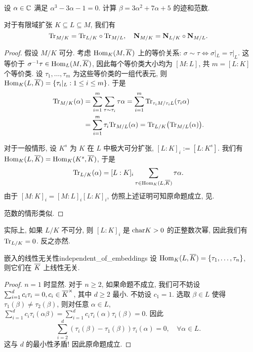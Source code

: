 \begin{exercise}
设 $\alpha\in{\mathbb{C}}$ 满足 $\alpha^3-3\alpha-1=0$. 计算 $\beta=3\alpha^2+7\alpha+5$ 的迹和范数.
\end{exercise}

\begin{corollary}{}{}
对于有限域扩张 $K\subseteq L\subseteq M$, 我们有
  \[{\mathrm{Tr}}_{M/K}={\mathrm{Tr}}_{L/K}\circ {\mathrm{Tr}}_{M/L},\quad {\mathbf{N}}_{M/K}={\mathbf{N}}_{L/K}\circ {\mathbf{N}}_{M/L}.\]
\end{corollary}
\begin{proof}
假设 $M/K$ 可分. 考虑 ${\mathrm{Hom}}_K(M,\overline K)$ 上的等价关系: $\sigma\sim\tau\iff \sigma|_L=\tau|_L$. 这等价于 $\sigma^{-1}\tau\in{\mathrm{Hom}}_L(M,\overline K)$, 因此每个等价类大小均为 $[M:L]$, 共 $m=[L:K]$ 个等价类. 设 $\tau_1,\dots,\tau_m$ 为这些等价类的一组代表元, 则 ${\mathrm{Hom}}_K(L,\overline K)=\left\{\tau_i|_L:1\le i\le m\right\}$. 于是
  \[\begin{split}
    {\mathrm{Tr}}_{M/K}(\alpha)&=\sum_{i=1}^m\sum_{\tau\sim\tau_i} \tau\alpha
      =\sum_{i=1}^m{\mathrm{Tr}}_{\tau_i M/\tau_i L}(\tau_i \alpha)\\
    &=\sum_{i=1}^m\tau_i{\mathrm{Tr}}_{M/L}(\alpha)
      ={\mathrm{Tr}}_{L/K}\bigl({\mathrm{Tr}}_{M/L}(\alpha)\bigr).
  \end{split}\]

对于一般情形, 设 $K^s$ 为 $K$ 在 $L$ 中极大可分扩张, $[L:K]_i:=[L:K^s]$. 我们有 ${\mathrm{Hom}}_{K}(L,\overline K)={\mathrm{Hom}}_K(K^s,\overline K)$, 于是
	\[{\mathrm{Tr}}_{L/K}(\alpha)=[L:K]_i\sum_{\tau\in{\mathrm{Hom}}_K(L,\overline K)}\tau\alpha.\]
由于 $[M:K]_i=[M:L]_i[L:K]_i$, 仿照上述证明可知原命题成立, 见\cite[Chapter II, \S 10]{ZariskiSamuel1958}.

范数的情形类似.
\end{proof}
\begin{remark}
实际上, 如果 $L/K$ 不可分, 则 $[L:K]_i$ 是 ${\mathrm{char}} K>0$ 的正整数次幂, 因此我们有 ${\mathrm{Tr}}_{L/K}=0$.
反之亦然.
\end{remark}

\begin{proposition}{嵌入的线性无关性}{independent_of_embeddings}
设 ${\mathrm{Hom}}_K(L,\overline K)=\left\{\tau_1,\dots,\tau_n\right\}$, 则它们在 $\overline K$ 上线性无关.
\end{proposition}
\begin{proof}
$n=1$ 时显然. 对于 $n\ge2$, 如果命题不成立, 我们可不妨设 $\sum_{i=1}^d c_i\tau_i=0,c_i\in\overline K^\times$, 其中 $d\ge 2$ 最小. 不妨设 $c_1=1$. 选取 $\beta\in L$ 使得 $\tau_1(\beta)\neq\tau_2(\beta)$, 则对任意 $\alpha\in L$, $\sum_{i=1}^d c_i\tau_i(\alpha\beta)=\sum_{i=1}^d c_i\tau_i(\alpha)\tau_i(\beta)=0$. 因此
	\[\sum_{i=2}^d(\tau_i(\beta)-\tau_1(\beta))\tau_i(\alpha)=0,\quad\forall \alpha\in L.\]
这与 $d$ 的最小性矛盾! 因此原命题成立.
\end{proof}


